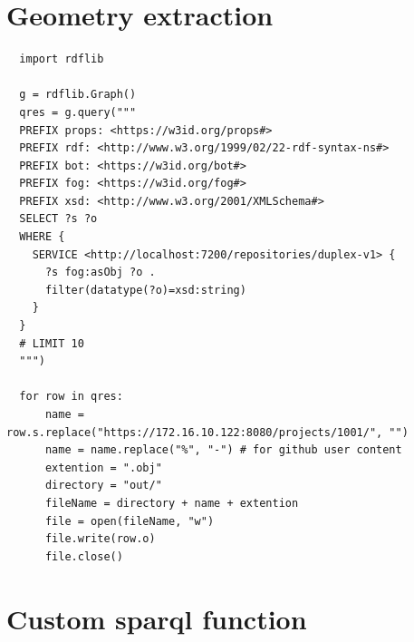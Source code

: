 \section{Geometry extraction}
\label{sec:pyhtonExtraction}
\begin{verbatim}
  import rdflib
  
  g = rdflib.Graph()
  qres = g.query("""
  PREFIX props: <https://w3id.org/props#>
  PREFIX rdf: <http://www.w3.org/1999/02/22-rdf-syntax-ns#>
  PREFIX bot: <https://w3id.org/bot#>
  PREFIX fog: <https://w3id.org/fog#>
  PREFIX xsd: <http://www.w3.org/2001/XMLSchema#>
  SELECT ?s ?o
  WHERE {
    SERVICE <http://localhost:7200/repositories/duplex-v1> {
      ?s fog:asObj ?o .
      filter(datatype(?o)=xsd:string)
    }
  }
  # LIMIT 10
  """)
  
  for row in qres:
      name = row.s.replace("https://172.16.10.122:8080/projects/1001/", "")
      name = name.replace("%", "-") # for github user content
      extention = ".obj"
      directory = "out/"
      fileName = directory + name + extention
      file = open(fileName, "w")
      file.write(row.o)
      file.close()
  \end{verbatim}


\clearpage
\section{Custom \acs{sparql} function}
\label{sec:customFunction}
\inputminted{js}{dynamicQueries/inQuery/function.js}
